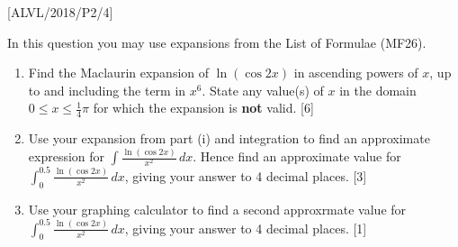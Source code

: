 \item {[}ALVL/2018/P2/4{]}

In this question you may use expansions from the List of Formulae
(MF26). 
\begin{enumerate}
\item Find the Maclaurin expansion of $\ln\left(\cos2x\right)$ in ascending
powers of $x$, up to and including the term in $x^{6}$. State any
value(s) of $x$ in the domain $0\le x\leq\frac{1}{4}\pi$ for which
the expansion is \textbf{not} valid.\hfill{} {[}6{]}
\item Use your expansion from part (i) and integration to find an approximate
expression for $\int\frac{\ln\left(\cos2x\right)}{x^{2}}\,dx$. Hence
find an approximate value for $\int_{0}^{0.5}\frac{\ln\left(\cos2x\right)}{x^{2}}\,dx$,
giving your answer to 4 decimal places.\hfill{} {[}3{]}
\item Use your graphing calculator to find a second approxrmate value for
$\int_{0}^{0.5}\frac{\ln\left(\cos2x\right)}{x^{2}}\,dx$, giving
your answer to 4 decimal places. \hfill{}{[}1{]}
\end{enumerate}
